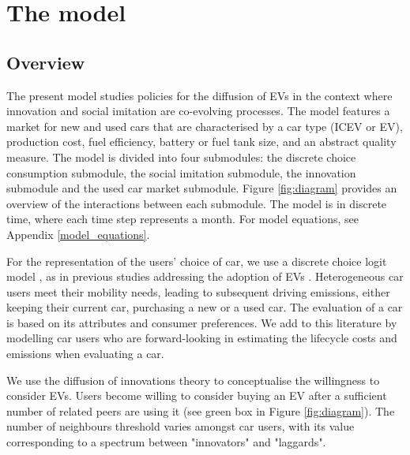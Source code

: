 \documentclass[12pt]{article}
\begin{document}
	\section{The model} \label{Sec_Model}
	\subsection{Overview} \label{Model_General}
	The present model studies policies for the diffusion of EVs in the context where innovation and social imitation are co-evolving processes. The model features a market for new and used cars that are characterised by a car type (ICEV or EV), production cost, fuel efficiency, battery or fuel tank size, and an abstract quality measure. The model is divided into four submodules: the discrete choice consumption submodule, the social imitation submodule, the innovation submodule and the used car market submodule. Figure \ref{fig:diagram} provides an overview of the interactions between each submodule. The model is in discrete time, where each time step represents a month. For model equations, see Appendix \ref{model_equations}.

	For the representation of the users' choice of car, we use a discrete choice logit model \citep{McFadden1974}, as in previous studies addressing the adoption of EVs \citep{EGGERS201151,shafiei2012agent,ostli2017generic}. Heterogeneous car users meet their mobility needs, leading to subsequent driving emissions, either keeping their current car, purchasing a new or a used car. The evaluation of a car is based on its attributes and consumer preferences. We add to this literature by modelling car users who are forward-looking in estimating the lifecycle costs and emissions when evaluating a car. %

	We use the diffusion of innovations theory \citep{rogers2003diffusion} to conceptualise the willingness to consider EVs. Users become willing to consider buying an EV after a sufficient number of related peers are using it (see green box in Figure \ref{fig:diagram}). The number of neighbours threshold varies amongst car users, with its value corresponding to a spectrum between "innovators" and "laggards".
\end{document}
